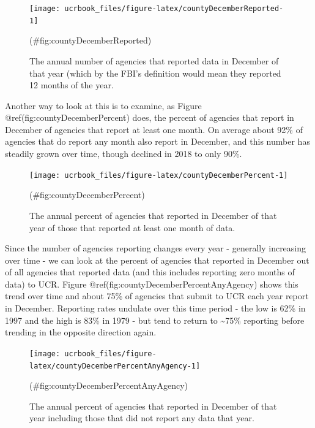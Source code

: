 \documentclass[
  12pt,
  openany]{book}
\begin{document}
\begin{figure}

{\centering \texttt{[image: ucrbook\_files/figure-latex/countyDecemberReported-1]} 

}

\caption{The annual number of agencies that reported data in December of that year (which by the FBI's definition would mean they reported 12 months of the year.}(\#fig:countyDecemberReported)
\end{figure}

Another way to look at this is to examine, as Figure @ref(fig:countyDecemberPercent) does, the percent of agencies that report in December of agencies that report at least one month. On average about 92\% of agencies that do report any month also report in December, and this number has steadily grown over time, though declined in 2018 to only 90\%.

\begin{figure}

{\centering \texttt{[image: ucrbook\_files/figure-latex/countyDecemberPercent-1]} 

}

\caption{The annual percent of agencies that reported in December of that year of those that reported at least one month of data.}(\#fig:countyDecemberPercent)
\end{figure}

Since the number of agencies reporting changes every year - generally increasing over time - we can look at the percent of agencies that reported in December out of all agencies that reported data (and this includes reporting zero months of data) to UCR. Figure @ref(fig:countyDecemberPercentAnyAgency) shows this trend over time and about 75\% of agencies that submit to UCR each year report in December. Reporting rates undulate over this time period - the low is 62\% in 1997 and the high is 83\% in 1979 - but tend to return to \textasciitilde75\% reporting before trending in the opposite direction again.

\begin{figure}

{\centering \texttt{[image: ucrbook\_files/figure-latex/countyDecemberPercentAnyAgency-1]} 

}

\caption{The annual percent of agencies that reported in December of that year including those that did not report any data that year.}(\#fig:countyDecemberPercentAnyAgency)
\end{figure}
\end{document}

